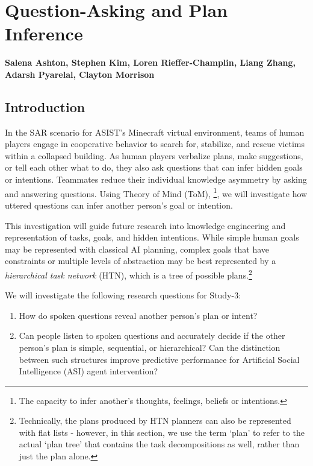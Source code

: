 \chapter{Question-Asking and Plan Inference}
\label{ch:question_plan}
\textbf{Salena Ashton, Stephen Kim, Loren Rieffer-Champlin, Liang Zhang,
Adarsh Pyarelal, Clayton Morrison}

\section{Introduction}

In the SAR scenario for ASIST's Minecraft virtual environment, teams of human players engage in cooperative behavior to search for, stabilize, and rescue victims within a collapsed building. As human players verbalize plans, make suggestions, or tell each other what to do, they also ask questions that can infer hidden goals or intentions. Teammates reduce their individual knowledge asymmetry by asking and answering questions. Using Theory of Mind (ToM), \footnote{The capacity to infer another's thoughts, feelings, beliefs or intentions.}, we will investigate how uttered questions can infer another person's goal or intention. 

This investigation will guide future research into knowledge engineering and representation of tasks, goals, and hidden intentions. While simple human goals may be represented with classical AI planning, complex goals that have constraints or multiple levels of abstraction may be best represented by a \emph{hierarchical task network} (HTN), which is a tree of possible plans.\footnote{Technically, the plans
    produced by HTN planners can also be represented with flat lists - however,
in this section, we use the term `plan' to refer to the actual `plan tree' that
contains the task decompositions as well, rather than just the plan alone.}




We will investigate the following research questions for Study-3:

\begin{enumerate}
    \item How do spoken questions reveal another person’s plan or intent? 
    \item Can people listen to spoken questions and accurately decide if the other person's plan
        is simple, sequential, or hierarchical? Can the distinction between such
        structures improve predictive performance for Artificial Social
        Intelligence (ASI) agent intervention?
\end{enumerate}

